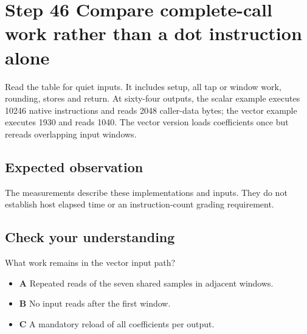 \section{Step 46 Compare complete-call work rather than a dot instruction alone}\label{fir-s46}

Read the table for quiet inputs. It includes setup, all tap or window work, rounding, stores and return. At sixty-four outputs, the scalar example executes 10246 native instructions and reads 2048 caller-data bytes; the vector example executes 1930 and reads 1040. The vector version loads coefficients once but rereads overlapping input windows.

\subsection{Expected observation}
The measurements describe these implementations and inputs. They do not establish host elapsed time or an instruction-count grading requirement.

\subsection{Check your understanding}
What work remains in the vector input path?

\begin{itemize}
  \item \textbf{A} Repeated reads of the seven shared samples in adjacent windows.
  \item \textbf{B} No input reads after the first window.
  \item \textbf{C} A mandatory reload of all coefficients per output.
\end{itemize}
